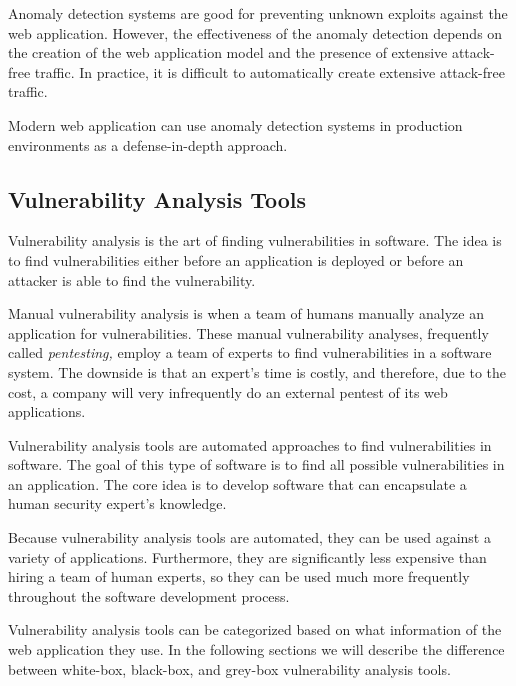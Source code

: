Anomaly detection systems are good for preventing unknown exploits
against the web application. However, the effectiveness of the anomaly
detection depends on the creation of the web application model and the
presence of extensive attack-free traffic. In practice, it is
difficult to automatically create extensive attack-free traffic.

Modern web application can use anomaly detection systems in production
environments as a defense-in-depth approach.



\subsection{Vulnerability Analysis Tools}

Vulnerability analysis is the art of finding vulnerabilities in
software. The idea is to find vulnerabilities either before an
application is deployed or before an attacker is able to find the
vulnerability.

Manual vulnerability analysis is when a team of humans manually
analyze an application for vulnerabilities. These manual vulnerability
analyses, frequently called \emph{pentesting,} employ a team of
experts to find vulnerabilities in a software system. The downside is
that an expert's time is costly, and therefore, due to the cost, a
company will very infrequently do an external pentest of its
web applications.

Vulnerability analysis tools are automated approaches to find
vulnerabilities in software. The goal of this type of software is to
find all possible vulnerabilities in an application. The core idea is
to develop software that can encapsulate a human security expert's
knowledge.

Because vulnerability analysis tools are automated, they can be used
against a variety of applications. Furthermore, they are significantly
less expensive than hiring a team of human experts, so they can be
used much more frequently throughout the software development process.

Vulnerability analysis tools can be categorized based on what
information of the web application they use. In the following sections
we will describe the difference between white-box, black-box, and
grey-box vulnerability analysis tools.

